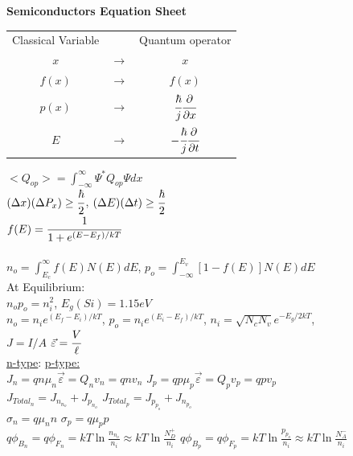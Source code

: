 \documentclass{article}
\newcommand\tab[1][1cm]{\hspace*{#1}}
\begin{document}
	\begin{center}\textbf{\LARGE{Semiconductors Equation Sheet}}\end{center}
	\begin{center}
	\begin{tabular}{ccc}
		Classical Variable && Quantum operator \\
		$x$ & $\rightarrow$ & $x$ \\
		$f(x)$ & $\rightarrow$ & $f(x)$ \\
		$p(x)$ & $\rightarrow$ & $\cfrac{\hbar}{j} \cfrac{\partial}{\partial x}$ \\
		$E$ & $\rightarrow$ & $-\cfrac{\hbar}{j} \cfrac{\partial}{\partial t}$ \\
	\end{tabular}
	\end{center}
	\begin{large}
	\hfill
	
	\noindent $<Q_{op}> = \int_{-\infty}^{\infty} \Psi^* Q_{op} \Psi dx$ \\
	
	\noindent $(\Delta x) (\Delta P_x) \geq \cfrac{\hbar}{2}$, \tab
	$(\Delta E) (\Delta t) \geq \cfrac{\hbar}{2}$ \\
	
	\noindent $f(E) = \cfrac{1}{1 + e^{(E-E_f)/kT}}$ \\\\
	$n_o = \int_{E_c}^{\infty} f(E)N(E)dE$, \tab
	$p_o = \int_{-\infty}^{E_v} [1-f(E)]N(E)dE$ \\
	
	\noindent At Equilibrium:\\
	$n_o p_o = n_i^2$, \tab $E_g(Si) = 1.15eV$\\
	
	\noindent $n_o = n_i e^{(E_f - E_i)/kT}$, \tab
	$p_o = n_i e^{(E_i - E_f)/kT}$, \tab
	$n_i = \sqrt{N_c N_v} e^{-E_g / 2kT}$, \\
	
	\noindent $J = I/A$ \tab $\vec{\varepsilon} = \cfrac{V}{\ell}$\\
	\underline{n-type}: \tab \tab \tab \tab \tab \tab \tab[0.5cm] \underline{p-type:} \\
$J_n = q n \mu_n \vec{\varepsilon} = Q_n v_n = q n v_n$  \tab \tab \tab
	$J_p = q p \mu_p \vec{\varepsilon} = Q_p v_p = qpv_p$ \\
	$J_{Total_n} = J_{n_{n_o}} + J_{p_{n_o}}$ \tab \tab \tab \tab[1.05cm] $J_{Total_p} = J_{p_{p_o}} + J_{n_{p_o}}$\\
	$\sigma_n = q \mu_n n$ \tab \tab \tab \tab \tab \tab $\sigma_p = q \mu_p p$\\
	$q \phi_{B_n} = q \phi_{F_n} = kT\ln\frac{n_{n_o}}{n_i} \approx kT\ln\frac{N_D^+}{n_i}$ \tab \tab[0.2cm]
	$q \phi_{B_p} = q \phi_{F_p} = kT\ln\frac{p_{p_o}}{n_i} \approx kT\ln\frac{N_A^-}{n_i}$ \\\\
	

\end{large}
\end{document}
